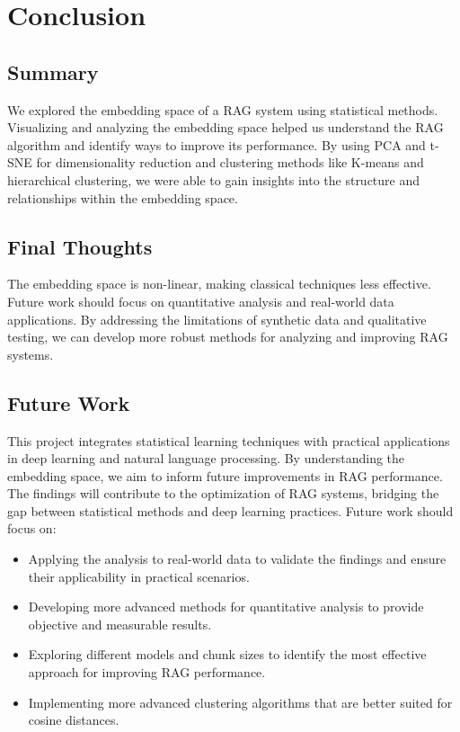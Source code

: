 \documentclass{scrartcl}
\begin{document}
\section{Conclusion}
\subsection{Summary}
We explored the embedding space of a RAG system using statistical methods. Visualizing and analyzing the embedding space helped us understand the RAG algorithm and identify ways to improve its performance. By using PCA and t-SNE for dimensionality reduction and clustering methods like K-means and hierarchical clustering, we were able to gain insights into the structure and relationships within the embedding space.

\subsection{Final Thoughts}
The embedding space is non-linear, making classical techniques less effective. Future work should focus on quantitative analysis and real-world data applications. By addressing the limitations of synthetic data and qualitative testing, we can develop more robust methods for analyzing and improving RAG systems.

\subsection{Future Work}
This project integrates statistical learning techniques with practical applications in deep learning and natural language processing. By understanding the embedding space, we aim to inform future improvements in RAG performance. The findings will contribute to the optimization of RAG systems, bridging the gap between statistical methods and deep learning practices. Future work should focus on:
\begin{itemize}
    \item Applying the analysis to real-world data to validate the findings and ensure their applicability in practical scenarios.
    \item Developing more advanced methods for quantitative analysis to provide objective and measurable results.
    \item Exploring different models and chunk sizes to identify the most effective approach for improving RAG performance.
    \item Implementing more advanced clustering algorithms that are better suited for cosine distances.
\end{itemize}
\end{document}
